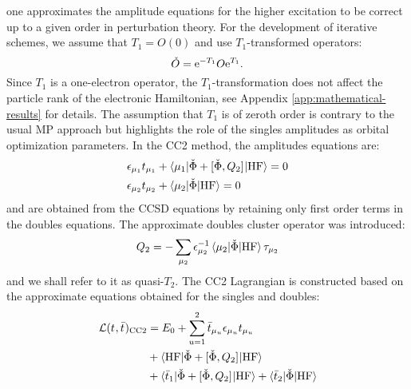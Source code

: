  one approximates the amplitude equations for
the higher excitation to be correct up to a given order in perturbation
theory.
For the development of iterative schemes, we assume that $T_1 = O(0)$
and use $T_1$-transformed operators:
\begin{equation}
  \label{eq:t1-transformation}
  \check{O} = \mathrm{e}^{-T_1}O\mathrm{e}^{T_1}.
\end{equation}
Since $T_1$ is a one-electron operator, the $T_1$-transformation does
not affect the particle rank of the electronic
Hamiltonian,\autocite{Koch1994-vr, Helgaker2000-tz}
see Appendix \ref{app:mathematical-results} for details.
The assumption that $T_1$ is of zeroth order is contrary to the usual
\acrshort{MP} approach but highlights the role of the singles
amplitudes as orbital optimization parameters.
In the \gls{CC2} method, the amplitudes equations are:\autocite{Christiansen1995-vy, Helgaker2000-tz}
\begin{subequations}\label{eq:cc2-amplitudes}
  \begin{align}
    \epsilon_{\mu_1}t_{\mu_1} &+ \braket{\mu_1 | \check{\Phi} +
    [ \check{\Phi}, Q_2 ]^{} | \mathrm{HF}} = 0
    \label{eq:cc2-singles-amplitudes} \\
    \epsilon_{\mu_2}t_{\mu_2} &+ \braket{\mu_2 | \check{\Phi} | \mathrm{HF}} = 0
    \label{eq:cc2-doubles-amplitudes}
  \end{align}
\end{subequations}
and are obtained from the \acrshort{CCSD} equations by retaining only
first order terms in the doubles equations.
The approximate doubles cluster operator was introduced:
\begin{equation}
  Q_2 = - \sum_{\mu_2}
  \epsilon_{\mu_2}^{-1}\braket{\mu_2 | \check{\Phi} | \mathrm{HF}}\tau_{\mu_2}
\end{equation}
and we shall refer to it as quasi-$T_2$.
The \acrshort{CC2} Lagrangian is constructed based on the approximate
equations obtained for the singles and
doubles:\autocite{Christiansen1995-vy, Helgaker2000-tz}
\begin{equation}\label{eq:cc2-lagrangian}
  \begin{aligned}
  \mathcal{L}(t_{}, \bar{t}_{})_\mathrm{CC2}
  &=
  E_0
  + \sum_{u=1}^{2}\bar{t}_{\mu_u}\epsilon_{\mu_u}t_{\mu_u} \\
  &+ \braket{\mathrm{HF} | \check{\Phi} + [ \check{\Phi}, Q_2 ]^{} | \mathrm{HF}} \\
  &+ \braket{\bar{t}_{1} |
  \check{\Phi} + [ \check{\Phi}, Q_2 ]^{}
  | \mathrm{HF}}
  + \braket{\bar{t}_{2} | \check{\Phi} | \mathrm{HF}}
  \end{aligned}
\end{equation}
